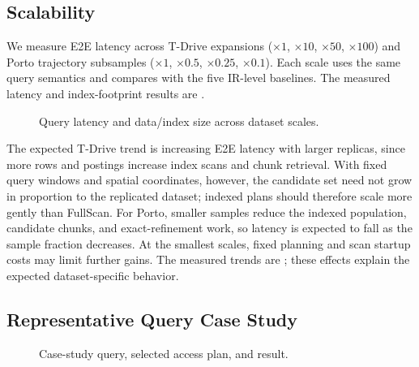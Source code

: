 \subsection{Scalability}\label{sec:exp-scalability}

We measure E2E latency across T-Drive expansions ($\times1$, $\times10$, $\times50$, $\times100$) and Porto trajectory subsamples ($\times1$, $\times0.5$, $\times0.25$, $\times0.1$). Each scale uses the same query semantics and compares \KART{} with the five IR-level baselines. The measured latency and index-footprint results are \TBD.

\begin{figure}[!htbp]
\centering
\begin{minipage}[t]{0.31\textwidth}\centering
{}
\end{minipage}\hfill
\begin{minipage}[t]{0.31\textwidth}\centering
{}
\end{minipage}\hfill
\begin{minipage}[t]{0.31\textwidth}\centering
{}
\end{minipage}
\caption{Query latency and data/index size across dataset scales.}\label{fig:exp-scalability}
\end{figure}
\FloatBarrier

The expected T-Drive trend is increasing E2E latency with larger replicas, since more rows and postings increase index scans and chunk retrieval. With fixed query windows and spatial coordinates, however, the candidate set need not grow in proportion to the replicated dataset; indexed plans should therefore scale more gently than FullScan. For Porto, smaller samples reduce the indexed population, candidate chunks, and exact-refinement work, so latency is expected to fall as the sample fraction decreases. At the smallest scales, fixed planning and scan startup costs may limit further gains. The measured trends are \TBD; these effects explain the expected dataset-specific behavior.

\subsection{Representative Query Case Study}\label{sec:exp-case-study}

\TBD

\begin{figure}[!htbp]
\centering
{}
\caption{Case-study query, selected access plan, and result.}\label{fig:exp-case-study}
\end{figure}
\FloatBarrier
